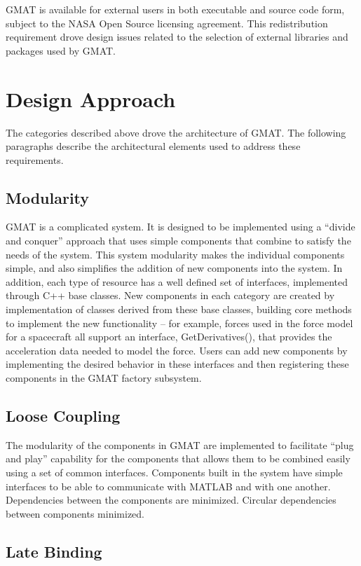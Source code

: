 GMAT is available for external users in both executable and source code form, subject to the NASA
Open Source licensing agreement.  This redistribution requirement drove design issues related to
the selection of external libraries and packages used by GMAT.

\section{Design Approach}

The categories described above drove the architecture of GMAT.  The following paragraphs describe
the architectural elements used to address these requirements.

\subsection{Modularity}

GMAT is a complicated system.  It is designed to be implemented using a ``divide and conquer''
approach that uses simple components that combine to satisfy the needs of the system.  This system
modularity makes the individual components simple, and also simplifies the addition of new
components into the system.  In addition, each type of resource has a well defined set of
interfaces, implemented through C++ base classes.  New components in each category are created by
implementation of classes derived from these base classes, building core methods to implement the
new functionality -- for example, forces used in the force model for a spacecraft all support an
interface, GetDerivatives(), that provides the acceleration data needed to model the force.  Users
can add new components by implementing the desired behavior in these interfaces and then registering
these components in the GMAT factory subsystem.

\subsection{Loose Coupling}

The modularity of the components in GMAT are implemented to facilitate ``plug and play'' capability
for the components that allows them to be combined easily using a set of common interfaces.
Components built in the system have simple interfaces to be able to communicate with MATLAB and with
one another.  Dependencies between the components are minimized.  Circular dependencies between
components minimized.

\subsection{Late Binding}


